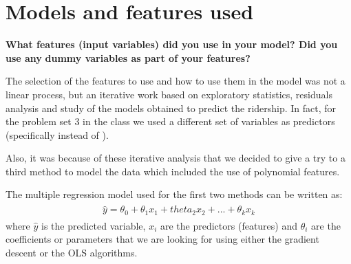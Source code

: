 \documentclass[a4paper,12pt,english]{sphinxmanual}
\begin{document}
\section{Models and features used}
\label{section2:models-and-features-used}
\textbf{What features (input variables) did you use in your model? Did you use any}
\textbf{dummy variables as part of your features?}

The selection of the features to use and how to use them in the model was not
a linear process, but an iterative work based on exploratory statistics,
residuals analysis and study of the models obtained to predict the ridership.
In fact, for the problem set 3 in the class we used a different set of variables
as predictors (specifically  instead of ).

Also, it was because of these iterative analysis that we decided to give a try
to a third method to model the data which included the use of polynomial
features.

The multiple regression model used for the first two methods can be written as:
\label{section2:multreg-mod}\label{section2:equation-multreg_mod}\begin{gather}
\begin{split}\hat y = \theta_0 + \theta_1 x_1 + theta_2 x_2 + ... + \theta_k x_k\end{split}\label{section2-multreg_mod}
\end{gather}
where \(\hat y\) is the predicted variable, \(x_i\) are the predictors
(features) and \(\theta_i\) are the coefficients or parameters that we are
looking for using either the gradient descent or the OLS algorithms.
\end{document}
